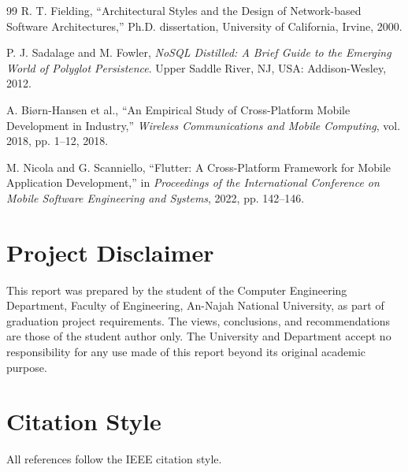 \documentclass[12pt, a4paper]{report}
\begin{document}
\begin{thebibliography}{99}
R. T. Fielding, ``Architectural Styles and the Design of Network-based Software Architectures,'' Ph.D. dissertation, University of California, Irvine, 2000.

P. J. Sadalage and M. Fowler, \textit{NoSQL Distilled: A Brief Guide to the Emerging World of Polyglot Persistence}. Upper Saddle River, NJ, USA: Addison-Wesley, 2012.

A. Biørn-Hansen et al., ``An Empirical Study of Cross-Platform Mobile Development in Industry,'' \textit{Wireless Communications and Mobile Computing}, vol. 2018, pp. 1--12, 2018.

M. Nicola and G. Scanniello, ``Flutter: A Cross-Platform Framework for Mobile Application Development,'' in \textit{Proceedings of the International Conference on Mobile Software Engineering and Systems}, 2022, pp. 142--146.

\end{thebibliography}

\appendix
\chapter{Project Disclaimer}
This report was prepared by the student of the Computer Engineering Department, Faculty of Engineering, An-Najah National University, as part of graduation project requirements. The views, conclusions, and recommendations are those of the student author only. The University and Department accept no responsibility for any use made of this report beyond its original academic purpose.

\chapter{Citation Style}
All references follow the IEEE citation style.
\end{document}
